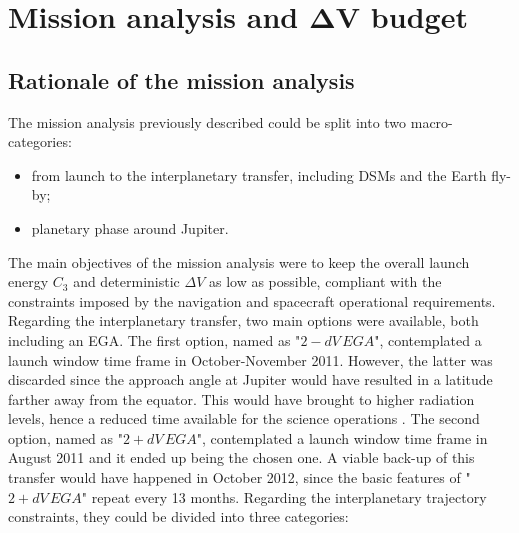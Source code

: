 \section
[\case{Mission analysis and \texorpdfstring{$\boldsymbol{\Delta V}$}{Delta-V} budget}
{Mission analysis and \texorpdfstring{$\Delta V$}{Delta-V} budget}]
{Mission analysis and \texorpdfstring{$\boldsymbol{\Delta V}$}{Delta-V} budget}
\label{sec:ma_and_dv}

\subsection{Rationale of the mission analysis}
\label{subsec:rationale_ma}

The mission analysis previously described could be split into two macro-categories:
\begin{itemize}
    \item from launch to the interplanetary transfer, including DSMs and the Earth fly-by;
    \item planetary phase around Jupiter.
\end{itemize}
The main objectives of the mission analysis were to keep the overall launch energy $C_3$ and deterministic $\Delta V$ as low as possible, compliant with the constraints imposed by the navigation and spacecraft operational requirements. Regarding the interplanetary transfer, two main options were available, both including an EGA. The first option, named as "$2- dV\,EGA$", contemplated a launch window time frame in October-November 2011. However, the latter was discarded since the approach angle at Jupiter would have resulted in a latitude farther away from the equator. This would have brought to higher radiation levels, hence a reduced time available for the science operations \cite{launch_period}. The second option, named as "$2+  dV\,EGA$", contemplated a launch window time frame in August 2011 and it ended up being the chosen one. A viable back-up of this transfer would have happened in October 2012, since the basic features of "$2+ dV\,EGA$" repeat every 13 months.
Regarding the interplanetary trajectory constraints, they could be divided into three categories:

